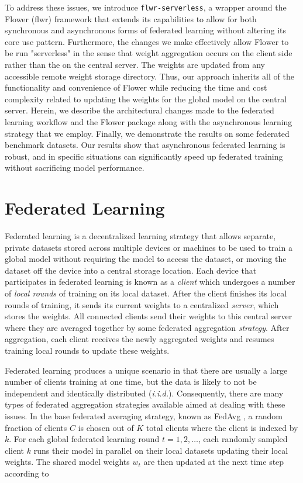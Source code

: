 \documentclass[twocolumn, switch]{article} %
\begin{document}
To address these issues, we introduce \texttt{flwr-serverless}, a wrapper around the Flower (flwr) framework that extends its capabilities to allow for both synchronous and asynchronous forms of federated learning without altering its core use pattern. Furthermore, the changes we make effectively allow Flower to be run "serverless" in the sense that weight aggregation occurs on the client side rather than the on the central server. The weights are updated from any accessible remote weight storage directory. Thus, our approach inherits all of the functionality and convenience of Flower while reducing the time and cost complexity related to updating the weights for the global model on the central server. Herein, we describe the architectural changes made to the federated learning workflow and the Flower package along with the asynchronous learning strategy that we employ. Finally, we demonstrate the results on some federated benchmark datasets. Our results show that asynchronous federated learning is robust, and in specific situations can significantly speed up federated training without sacrificing model performance.  

\section{Federated Learning}

Federated learning is a decentralized learning strategy that allows separate, private datasets stored across multiple devices or machines to be used to train a global model without requiring the model to access the dataset, or moving the dataset off the device into a central storage location. Each device that participates in federated learning is known as a \textit{client} which undergoes a number of \textit{local rounds} of training on its local dataset. After the client finishes its local rounds of training, it sends its current weights to a centralized \textit{server}, which stores the weights. All connected clients send their weights to this central server where they are averaged together by some federated aggregation \textit{strategy}. After aggregation, each client receives the newly aggregated weights and resumes training local rounds to update these weights.

Federated learning produces a unique scenario in that there are usually a large number of clients training at one time, but the data is likely to not be independent and identically distributed (\textit{i.i.d.}). Consequently, there are many types of federated aggregation strategies available aimed at dealing with these issues. In the base federated averaging strategy, known as FedAvg \cite{fed_2}, a random fraction of clients $C$ is chosen out of $K$ total clients where the client is indexed by $k$. For each global federated learning round $t=1, 2, \dots$, each randomly sampled client $k$ runs their model in parallel on their local datasets updating their local weights. The shared model weights $w_t$ are then updated at the next time step according to
\end{document}
